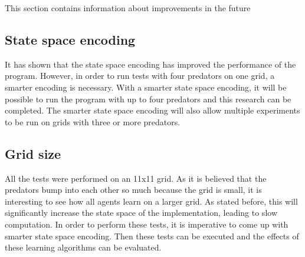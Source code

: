 This section contains information about improvements in the future

\subsection{State space encoding}
It has shown that the state space encoding has improved the performance of the program. However, in order to run tests with four predators on one grid, a smarter encoding is necessary. With a smarter state space encoding, it will be possible to run the program with up to four predators and this research can be completed. The smarter state space encoding will also allow multiple experiments to be run on grids with three or more predators. 

\subsection{Grid size}
All the tests were performed on an 11x11 grid. As it is believed that the predators bump into each other so much because the grid is small, it is interesting to see how all agents learn on a larger grid. As stated before, this will significantly increase the state space of the implementation, leading to slow computation. In order to perform these tests, it is imperative to come up with smarter state space encoding. Then these tests can be executed and the effects of these learning algorithms can be evaluated.